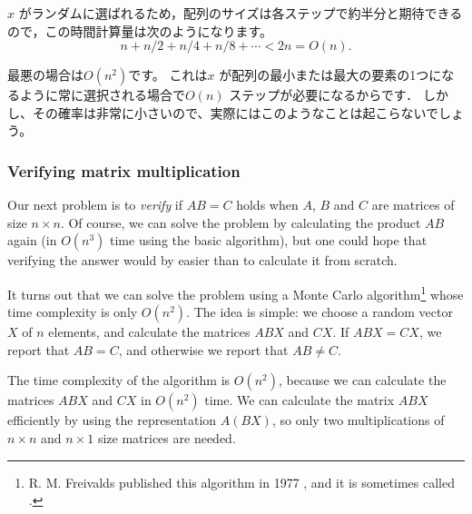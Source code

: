 $x$ がランダムに選ばれるため，配列のサイズは各ステップで約半分と期待できるので，この時間計算量は次のようになります。
\[n+n/2+n/4+n/8+\cdots < 2n = O(n).\]

最悪の場合は$O(n^2)$です。
これは$x$ が配列の最小または最大の要素の1つになるように常に選択される場合で$O(n)$ ステップが必要になるからです．
しかし、その確率は非常に小さいので、実際にはこのようなことは起こらないでしょう。

\subsubsection{Verifying matrix multiplication}


Our next problem is to \emph{verify}
if $AB=C$ holds when $A$, $B$ and $C$
are matrices of size $n \times n$.
Of course, we can solve the problem
by calculating the product $AB$ again
(in $O(n^3)$ time using the basic algorithm),
but one could hope that verifying the
answer would by easier than to calculate it from scratch.

It turns out that we can solve the problem
using a Monte Carlo algorithm\footnote{R. M. Freivalds published
this algorithm in 1977 \cite{fre77}, and it is sometimes
called  .} whose
time complexity is only $O(n^2)$.
The idea is simple: we choose a random vector
$X$ of $n$ elements, and calculate the matrices
$ABX$ and $CX$. If $ABX=CX$, we report that $AB=C$,
and otherwise we report that $AB \neq C$.

The time complexity of the algorithm is
$O(n^2)$, because we can calculate the matrices
$ABX$ and $CX$ in $O(n^2)$ time.
We can calculate the matrix $ABX$ efficiently
by using the representation $A(BX)$, so only two
multiplications of $n \times n$ and $n \times 1$
size matrices are needed.


